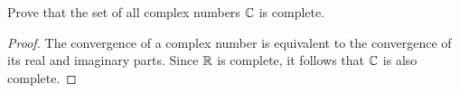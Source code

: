 \begin{problem}[Completeness of $ \C $]
	Prove that the set of all complex numbers $ \C $ is complete.
\end{problem}
\begin{proof}
	The convergence of a complex number is equivalent to the convergence of its real and imaginary parts. Since $ \mathbb{R} $ is complete, it follows that $ \C $ is also complete.
\end{proof}